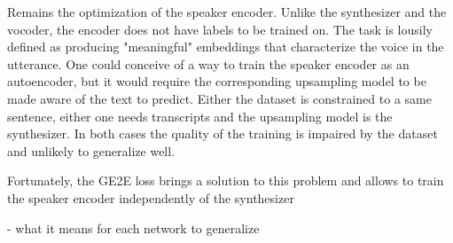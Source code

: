 \documentclass[a4paper, oneside, 12pt, english]{article}
\begin{document}
Remains the optimization of the speaker encoder. Unlike the synthesizer and the vocoder, the encoder does not have labels to be trained on. The task is lousily defined as producing "meaningful" embeddings that characterize the voice in the utterance. One could conceive of a way to train the speaker encoder as an autoencoder, but it would require the corresponding upsampling model to be made aware of the text to predict. Either the dataset is constrained to a same sentence, either one needs transcripts and the upsampling model is the synthesizer. In both cases the quality of the training is impaired by the dataset and unlikely to generalize well.

Fortunately, the GE2E loss \citep{GE2E} brings a solution to this problem and allows to train the speaker encoder independently of the synthesizer


- what it means for each network to generalize









\clearpage

 




















\end{document}
